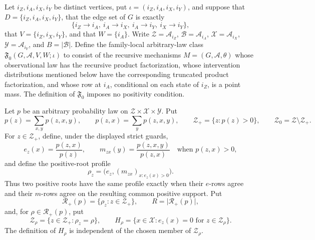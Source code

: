 Let \(i_Z,i_A,i_X,i_Y\) be distinct vertices, put
\(\iota=(i_Z,i_A,i_X,i_Y)\), and suppose that
\(D=\{i_Z,i_A,i_X,i_Y\}\), that the edge set of \(G\) is exactly
\[
 \{i_Z\mathbin{\to}i_A,\ i_A\mathbin{\to}i_X,
   \ i_A\mathbin{\to}i_Y,\ i_X\mathbin{\to}i_Y\},
\]
that \(V=\{i_Z,i_X,i_Y\}\), and that \(W=\{i_A\}\).  Write
\(\mathcal Z=\mathcal A_{i_Z}\), \(\mathcal B=\mathcal A_{i_A}\),
\(\mathcal X=\mathcal A_{i_X}\), \(\mathcal Y=\mathcal A_{i_Y}\),
and \(B=\lvert\mathcal B\rvert\).  Define the family-local
arbitrary-law class \(\mathfrak F_0(G,\mathcal A,V,W;\iota)\) to consist
of the recursive mechanisms \(M=(G,\mathcal A,\theta)\) whose
observational law has the recursive product factorization, whose
intervention distributions mentioned below have the corresponding
truncated product factorization, and whose row at \(i_A\), conditional on
each state of \(i_Z\), is a point mass.  The definition of
\(\mathfrak F_0\) imposes no positivity condition.

Let \(p\) be an arbitrary probability law on
\(\mathcal Z\times\mathcal X\times\mathcal Y\).  Put
\[
 p(z)=\sum_{x,y}p(z,x,y),\qquad
 p(z,x)=\sum_y p(z,x,y),\qquad
 \mathcal Z_+=\{z:p(z)>0\},\qquad
 \mathcal Z_0=\mathcal Z\setminus\mathcal Z_+.
\]
For \(z\in\mathcal Z_+\), define, under the displayed strict guards,
\[
 e_z(x)=\frac{p(z,x)}{p(z)},\qquad
 m_{zx}(y)=\frac{p(z,x,y)}{p(z,x)}
 \quad\text{when }p(z,x)>0,
\]
and define the positive-root profile
\[
 \rho_z=\bigl(e_z,(m_{zx})_{x:e_z(x)>0}\bigr).
\]
Thus two positive roots have the same profile exactly when their
\(e\)-rows agree and their \(m\)-rows agree on the resulting common
positive support.  Put
\[
 \mathcal R_+(p)=\{\rho_z:z\in\mathcal Z_+\},\qquad
 R=\lvert\mathcal R_+(p)\rvert,
\]
and, for \(\rho\in\mathcal R_+(p)\), put
\[
 \mathcal Z_\rho=\{z\in\mathcal Z_+:\rho_z=\rho\},\qquad
 H_\rho=\{x\in\mathcal X:e_z(x)=0\text{ for }z\in\mathcal Z_\rho\}.
\]
The definition of \(H_\rho\) is independent of the chosen member of
\(\mathcal Z_\rho\).

